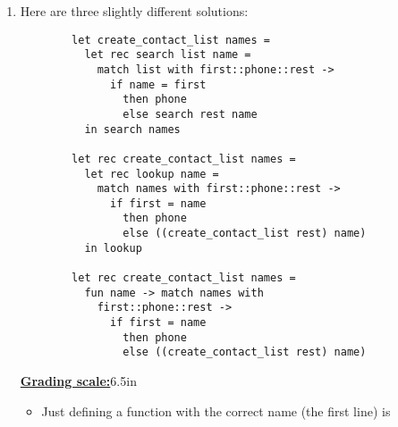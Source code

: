 \documentclass[11pt,fleqn]{article}
\begin{document}
\begin{enumerate}


    \item Here are three slightly different solutions:

          \vspace{-2.75mm}

          \begin{Verbatim}
        let create_contact_list names =
          let rec search list name =
            match list with first::phone::rest ->
              if name = first
                then phone
                else search rest name
          in search names

        let rec create_contact_list names =
          let rec lookup name =
            match names with first::phone::rest ->
              if first = name
                then phone
                else ((create_contact_list rest) name)
          in lookup

        let rec create_contact_list names =
          fun name -> match names with
            first::phone::rest ->
              if first = name
                then phone
                else ((create_contact_list rest) name)
          \end{Verbatim}

          \vspace{-1mm}

          \begin{info}{\textbf{\underline{Grading scale:}}}{6.5in}

            \begin{itemize}

              \addtolength{\itemsep}{1mm}

              \item Just defining a function with the correct name (the first
                    line) is 


\end{itemize}
\end{info}
\end{enumerate}
\end{document}

